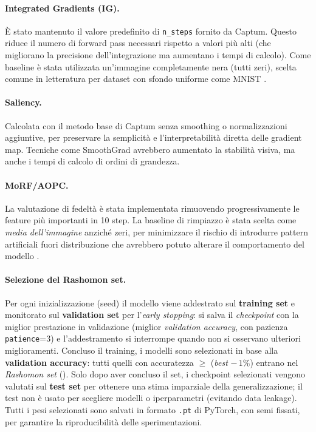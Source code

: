 \documentclass[12pt,a4paper,oneside]{report}
\numberwithin{figure}{chapter}
\numberwithin{table}{chapter}
\begin{document}
\paragraph{Integrated Gradients (IG).}
È stato mantenuto il valore predefinito di \texttt{n\_steps} fornito da Captum.
Questo riduce il numero di forward pass necessari rispetto a valori più alti (che migliorano la precisione dell’integrazione ma aumentano i tempi di calcolo).
Come baseline è stata utilizzata un’immagine completamente nera (tutti zeri), scelta comune in letteratura per dataset con sfondo uniforme come MNIST \citep{sundararajan2017axiomatic}.

\paragraph{Saliency.}
Calcolata con il metodo base di Captum senza smoothing o normalizzazioni
aggiuntive, per preservare la semplicità e l’interpretabilità diretta delle
gradient map. Tecniche come SmoothGrad \citep{smilkov2017smoothgrad} avrebbero
aumentato la stabilità visiva, ma anche i tempi di calcolo di ordini di
grandezza.

\paragraph{MoRF/AOPC.}
La valutazione di fedeltà è stata implementata rimuovendo progressivamente le
feature più importanti in 10 step. La baseline di rimpiazzo è stata scelta come
\textit{media dell’immagine} anziché zeri, per minimizzare il rischio di
introdurre pattern artificiali fuori distribuzione che avrebbero potuto
alterare il comportamento del modello \citep{samek2016evaluating}.
\paragraph{Selezione del Rashomon set.}
Per ogni inizializzazione (seed) il modello viene addestrato sul
\textbf{training set} e monitorato sul \textbf{validation set} per
l'\emph{early stopping}: si salva il \emph{checkpoint} con la miglior
prestazione in validazione (miglior \emph{validation accuracy}, con pazienza
\texttt{patience}=3) e l'addestramento si interrompe quando non si osservano
ulteriori miglioramenti. Concluso il training, i modelli sono selezionati in
base alla \textbf{validation accuracy}: tutti quelli con accuratezza $\geq$
(\emph{best} $-\,1\%$) entrano nel \emph{Rashomon set}
(\citealp{mueller2023rashomon}). Solo dopo aver concluso il set, i checkpoint
selezionati vengono valutati sul \textbf{test set} per ottenere una stima
imparziale della generalizzazione; il test non è usato per scegliere modelli o
iperparametri (evitando data leakage). Tutti i pesi selezionati sono salvati in
formato \texttt{.pt} di PyTorch, con semi fissati, per garantire la
riproducibilità delle sperimentazioni.
\end{document}

